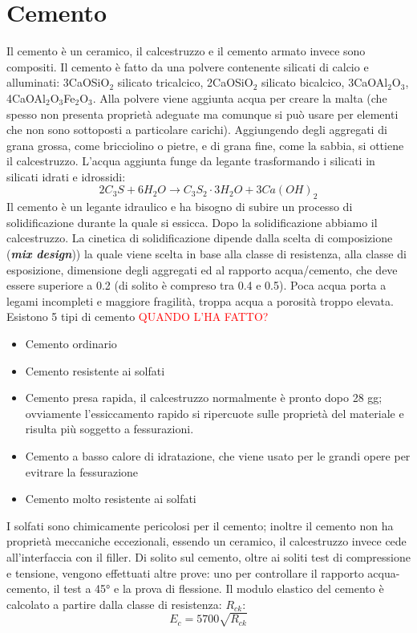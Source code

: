\documentclass{article}
\begin{document}
\newpage

\section{Cemento}

Il cemento è un ceramico, il calcestruzzo e il cemento armato invece sono compositi. Il cemento è fatto da una polvere contenente silicati di calcio e alluminati:
3CaOSiO$_2$ silicato tricalcico, 2CaOSiO$_2$ silicato bicalcico, 3CaOAl$_2$O$_3$, 4CaOAl$_2$O$_3$Fe$_2$O$_3$. Alla polvere viene aggiunta acqua per creare la malta (che spesso non presenta proprietà adeguate ma comunque si può usare per elementi che non sono sottoposti a particolare carichi).
Aggiungendo degli aggregati di grana grossa, come bricciolino o pietre, e di grana fine, come la sabbia, si ottiene il calcestruzzo. L'acqua aggiunta funge da legante trasformando i silicati in silicati idrati e idrossidi:
$$2C_3S+6H_2O\rightarrow C_3S_2\cdot3H_2O+3Ca(OH)_2$$ 
Il cemento è un legante idraulico e ha bisogno di subire un processo di solidificazione durante la quale si essicca. Dopo la solidificazione abbiamo il calcestruzzo. La cinetica di solidificazione dipende dalla scelta di composizione (\textbf{\textit{mix design}})) la quale viene scelta in base alla classe di resistenza, alla classe di esposizione, dimensione degli aggregati ed al rapporto acqua/cemento, che deve essere superiore a 0.2 (di solito è compreso tra 0.4 e 0.5). Poca acqua porta a legami incompleti e maggiore fragilità, troppa acqua a porosità troppo elevata.
Esistono 5 tipi di cemento \textcolor{red}{QUANDO L'HA FATTO?}
\begin{itemize}
    \item Cemento ordinario
    \item Cemento resistente ai solfati
    \item Cemento presa rapida, il calcestruzzo normalmente è pronto dopo 28 gg; ovviamente l'essiccamento rapido si ripercuote sulle proprietà del materiale e risulta più soggetto a fessurazioni.
    \item Cemento a basso calore di idratazione, che viene usato per le grandi opere per evitrare la fessurazione
    \item Cemento molto resistente ai solfati
\end{itemize}
I solfati sono chimicamente pericolosi per il cemento; inoltre il cemento non ha proprietà meccaniche eccezionali, essendo un ceramico, il calcestruzzo invece cede all'interfaccia con il filler. Di solito sul cemento, oltre ai soliti test di compressione e tensione, vengono effettuati altre prove: uno per controllare il rapporto acqua-cemento, il test a 45° e la prova di flessione. Il modulo elastico del cemento è calcolato a partire dalla classe di resistenza: $R_{ck}$:
\begin{equation}
    E_c=5700\sqrt{R_{ck}}
\end{equation}
\end{document}
